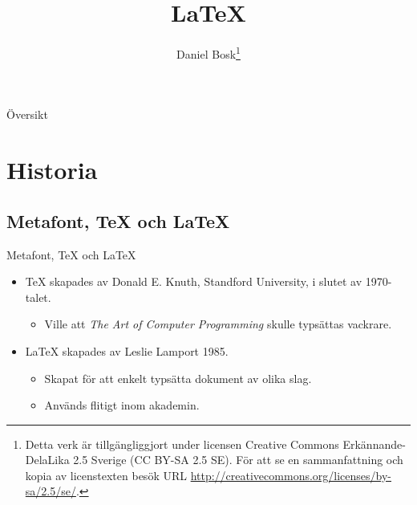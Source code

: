 \documentclass{beamer} %
\title{%
	\LaTeX
}
\author{Daniel Bosk\footnote{%
	\tiny
	Detta verk är tillgängliggjort under licensen Creative Commons 
	Erkännande-DelaLika 2.5 Sverige (CC BY-SA 2.5 SE).
	För att se en sammanfattning och kopia av licenstexten besök URL 
	\url{http://creativecommons.org/licenses/by-sa/2.5/se/}.
}}
\institute[MIUN ITM]{%
	Institutionen för informationsteknologi och medier (ITM),\\
	Mittuniversitetet, Sundsvall.
}
\date{\svnId}
\begin{document}
\begin{frame}
  \titlepage
\end{frame}
\begin{frame}{Översikt}
	\tableofcontents%
\end{frame}

\section{Historia}

\subsection{Metafont, \TeX{} och \LaTeX{}}
\begin{frame}{Metafont, \TeX{} och \LaTeX{}}
	\begin{itemize}
		\item \TeX{} skapades av Donald E. Knuth, Standford University, i slutet av 
			1970-talet.
			\begin{itemize}
				\item Ville att \emph{The Art of Computer Programming} 
					\citep{Knuth1997tao} skulle typsättas vackrare.
			\end{itemize}
		\item \LaTeX{} skapades av Leslie Lamport 1985.
			\begin{itemize}
				\item Skapat för att enkelt typsätta dokument av olika slag.
				\item Används flitigt inom akademin.
			\end{itemize}
	\end{itemize}
\end{frame}
\end{document}
